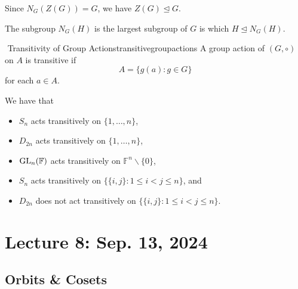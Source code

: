        \begin{example}
            Since \(N_G(Z(G))=G\), we have \(Z(G)\trianglelefteq G\).
        \end{example}
        \begin{remark*}
            The subgroup \(N_G(H)\) is the largest subgroup of \(G\) is which \(H\trianglelefteq N_G(H)\).
        \end{remark*}
        \begin{definition}{\Stop\,\,Transitivity of Group Actions}{transitivegroupactions}
            A group action of \((G,\circ)\) on \(A\) is transitive if
            \begin{equation*}
                A=\{g(a):g\in G\}
            \end{equation*}
            for each \(a\in A\).
        \end{definition}
        \begin{example}
            We have that
            \begin{itemize}
                \item \(S_n\) acts transitively on \(\{1,\ldots,n\}\),
                \item \(D_{2n}\) acts transitively on \(\{1,\ldots,n\}\),
                \item \(\operatorname{GL}_n(\mathbb{F})\) acts transitively on \(\mathbb{F}^n\backslash\{0\}\),
                \item \(S_n\) acts transitively on \(\{\{i,j\}:1\leq i<j\leq n\}\), and 
                \item \(D_{2n}\) does not act transitively on \(\{\{i,j\}:1\leq i<j\leq n\}\).
            \end{itemize}
        \end{example}

\pagebreak

\section{Lecture 8: Sep. 13, 2024}

    \subsection{Orbits \& Cosets}

